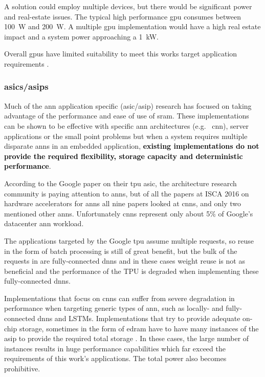 A solution could employ multiple devices, but there would be significant power and real-estate issues. 
The typical high performance \ac{gpu} consumes between \SI{100}{\watt} and \SI{200}{\watt}.
A multiple \ac{gpu} implementation would have a high real estate impact and a system power approaching a \SI[per-mode=symbol]{1}{\kilo \watt}.

Overall \acp{gpu} have limited suitability to meet this works target application requirements \cite{dadiannao2017}.


\subsubsection{\Acp{asic}/\Acp{asip}}
\label{sec:asicAndAsip}
Much of the \ac{ann} application specific (\ac{asic}/\ac{asip}) research has focused on taking advantage of the performance and ease of use of \acf{sram}.
These implementations can be shown to be effective with specific \ac{ann} architectures (e.g. \ \ac{cnn}), server applications or the small point problems but when a system requires multiple disparate \ac{ann}s in an embedded application, \textbf{\textcolor{black}{existing implementations do not provide the required flexibility, storage capacity and deterministic performance}}.

\iffalse Even in cloud applications, there are limitations on reuse. \fi 
According to the Google paper \cite{tensorflow2015-whitepaper} on their \ac{tpu} \ac{asic}, the architecture research community is paying attention to \acp{ann}, but of all the papers at ISCA 2016 on hardware accelerators for \acp{ann} all nine papers looked at \ac{cnn}s, and only two mentioned other \acp{ann}. 
Unfortunately \ac{cnn}s represent only about 5\% of Google's datacenter \ac{ann} workload.

The applications targeted by the Google \ac{tpu} \cite{tensorflow2015-whitepaper} assume multiple requests, so reuse in the form of batch processing is still of great benefit, but the bulk of the requests in \cite{tensorflow2015-whitepaper} are fully-connected \ac{dnn}s and in these cases weight reuse is not as beneficial and the performance of the TPU is degraded when implementing these fully-connected \ac{dnn}s.

Implementations that focus on \ac{cnn}s can suffer from severe degradation in performance when targeting generic types of \ac{ann}, such as locally- and fully-connected \ac{dnn}s and LSTMs.
Implementations that try to provide adequate on-chip storage, sometimes in the form of \ac{edram} have to have many instances of the \ac{asip} to provide the required total storage \cite{dadiannao2017}. 
In these cases, the large number of instances results in huge performance capabilities which far exceed the requirements of this work's applications. The total power also becomes prohibitive.

